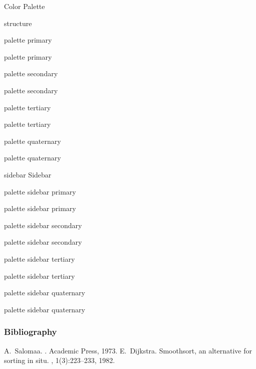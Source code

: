 \documentclass[titlebar,fancyfoot,11pt]{khbeamer}
\begin{document}
\begin{frame}{Color Palette}

\textcolor{structure}{structure}

\begin{minipage}{10em}
	\begin{beamercolorbox}{palette primary}
	\strut palette primary
	\end{beamercolorbox}

	\begin{beamercolorbox}{palette secondary}
	\strut palette secondary
	\end{beamercolorbox}

	\begin{beamercolorbox}{palette tertiary}
	\strut palette tertiary
	\end{beamercolorbox}

	\begin{beamercolorbox}{palette quaternary}
	\strut palette quaternary
	\end{beamercolorbox}
\end{minipage}

\begin{minipage}{12em}
\small
\begin{beamercolorbox}{sidebar}
	Sidebar

	\begin{beamercolorbox}{palette sidebar primary}
	\strut palette sidebar primary
	\end{beamercolorbox}

	\begin{beamercolorbox}{palette sidebar secondary}
	\strut palette sidebar secondary
	\end{beamercolorbox}

	\begin{beamercolorbox}{palette sidebar tertiary}
	\strut palette sidebar tertiary
	\end{beamercolorbox}

	\begin{beamercolorbox}{palette sidebar quaternary}
	\strut palette sidebar quaternary
	\end{beamercolorbox}
\end{beamercolorbox}
\end{minipage}
\end{frame}


\begin{frame}
\frametitle{Bibliography}
\begin{thebibliography}{Dijkstra, 1982}
A.~Salomaa.
.
\newblock Academic Press, 1973.
E.~Dijkstra.
\newblock Smoothsort, an alternative for sorting in situ.
, 1(3):223--233, 1982.
\end{thebibliography}
\end{frame}
\end{document}
